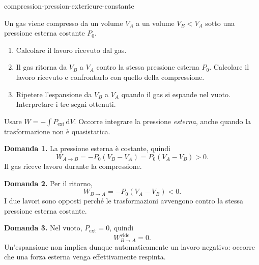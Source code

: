\begin{exo}{compression-pression-exterieure-constante}

Un gas viene compresso da un volume $V_A$ a un volume $V_B<V_A$ sotto una
pressione esterna costante $P_0$.

\begin{enumerate}
\item Calcolare il lavoro ricevuto dal gas.
\item Il gas ritorna da $V_B$ a $V_A$ contro la stessa pressione esterna $P_0$. Calcolare il lavoro ricevuto e confrontarlo con quello della compressione.
\item Ripetere l'espansione da $V_B$ a $V_A$ quando il gas si espande nel vuoto. Interpretare i tre segni ottenuti.
\end{enumerate}

\begin{indication}
Usare $W=-\int P_{\mathrm{ext}}\,\mathrm{d}V$. Occorre integrare la pressione
\emph{esterna}, anche quando la trasformazione non è quasistatica.
\end{indication}

\begin{solution}
\textbf{Domanda 1.} La pressione esterna è costante, quindi
\[W_{A\to B}=-P_0(V_B-V_A)=P_0(V_A-V_B)>0.\]
Il gas riceve lavoro durante la compressione.

\textbf{Domanda 2.} Per il ritorno,
\[W_{B\to A}=-P_0(V_A-V_B)<0.\]
I due lavori sono opposti perché le trasformazioni avvengono contro la stessa
pressione esterna costante.

\textbf{Domanda 3.} Nel vuoto, $P_{\mathrm{ext}}=0$, quindi
\[W_{B\to A}^{\mathrm{vide}}=0.\]
Un'espansione non implica dunque automaticamente un lavoro negativo: occorre
che una forza esterna venga effettivamente respinta.
\end{solution}
\end{exo}
